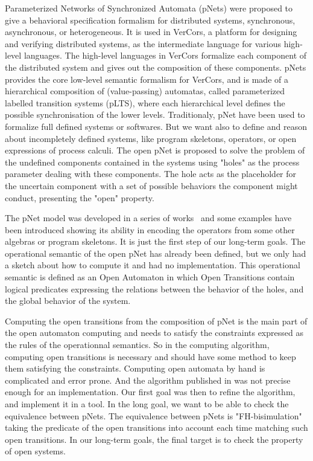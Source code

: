 \documentclass{lncs/llncs}
\begin{document}
Parameterized Networks of Synchronized Automata (pNets) were proposed
to give a behavioral specification formalism for distributed
systems, synchronous, asynchronous, or heterogeneous. It is used in
VerCors, a platform for designing and 
verifying distributed systems, as the intermediate language for various
high-level languages. The high-level languages in VerCors formalize
each component of the 
distributed system and gives out the composition of these
components.
pNets provides the core low-level semantic formalism for VerCors, and
is made of a hierarchical composition of (value-passing) automatas,
called parameterized labelled transition systems (pLTS), where each
hierarchical level defines the possible synchronisation of the lower levels.
Traditionaly, pNet have been used to formalize full
defined systems or softwares. But we want also to define and reason
about incompletely defined systems, like program skeletons, operators,
or open expressions of process calculi.
The open pNet is proposed to solve the
problem of the undefined components contained in the systems using
"holes" as the process parameter dealing with these components. The
hole acts as the placeholder for the uncertain component with a set of
possible behaviors the component might conduct, presenting the "open"
property.  

The pNet model was developed in a series of
works~\cite{HMZ:PDP15,henrio:Forte2016} and some examples have been
introduced showing its ability in encoding the operators from some
other algebras or  program skeletons. It is just the first step of
our long-term goals. The operational semantic of the open pNet has
already been defined, but we only had a sketch about how to compute it and
had no implementation. This operational semantic is defined as an
Open Automaton in which Open Transitions contain logical predicates
expressing the relations between the behavior of the holes, and the
global behavior of the system.

Computing the open transitions from the composition of pNet is the
main part of the open 
automaton computing and needs to satisfy the constraints expressed as
the rules of the operationnal semantics. So in
the computing algorithm, computing open transitions is necessary and
should have some method to keep them satisfying the constraints.
Computing open automata by hand is complicated and error prone. And
the algorithm published in \cite{henrio:Forte2016} was not precise
enough for an implementation. Our first goal was then to refine the
algorithm, and implement it in a tool.
In the long goal, we want to be able to check the equivalence between
pNets. The equivalence between pNets is "FH-bisimulation" taking the
predicate of the open transitions into account each time matching such
open transitions. In our long-term goals, the final target is to check
the property of open systems.
\end{document}
